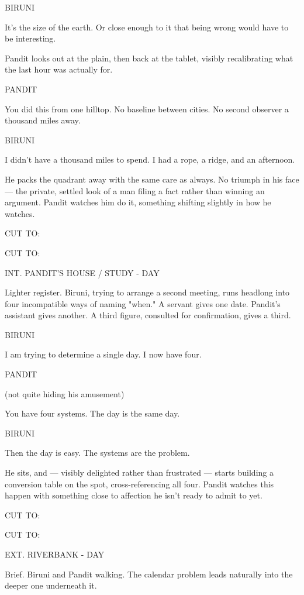 \documentclass[12pt]{article}
\newcommand{\sceneheading}[1]{%
  \needspace{4\baselineskip}%
  \par\vspace{1\baselineskip}\noindent #1\par\vspace{0.6\baselineskip}%
}
\newcommand{\action}[1]{%
  \par\noindent #1\par\vspace{0.6\baselineskip}%
}
\newcommand{\transition}[1]{%
  \par\vspace{0.3\baselineskip}%
  \ifthenelse{\equal{#1}{FADE IN:}}%
    {\noindent #1\par}%
    {\noindent\hfill #1\par}%
  \vspace{0.6\baselineskip}%
}
\newcommand{\charcue}[1]{%
  \needspace{3\baselineskip}%
  \par\vspace{0.3\baselineskip}\noindent\hspace*{2.2in}#1\par%
}
\newenvironment{dialogue}{%
  \begin{list}{}{%
    \setlength{\leftmargin}{1.1in}%
    \setlength{\rightmargin}{1.6in}%
    \setlength{\listparindent}{0pt}%
    \setlength{\itemindent}{0pt}%
    \setlength{\parsep}{0pt}%
    \setlength{\itemsep}{0pt}%
    \setlength{\topsep}{0pt}%
  }\item[]%
}{%
  \end{list}\vspace{0.4\baselineskip}%
}
\newcommand{\parenthetical}[1]{%
  \hspace*{-0.4in}\hspace*{1.1in}(#1)\par%
}
\begin{document}
\charcue{BIRUNI}
\begin{dialogue}
It's the size of the earth. Or close enough to it that being wrong would have to be interesting.\\
\end{dialogue}
\action{Pandit looks out at the plain, then back at the tablet, visibly recalibrating what the last hour was actually for.}
\charcue{PANDIT}
\begin{dialogue}
You did this from one hilltop. No baseline between cities. No second observer a thousand miles away.\\
\end{dialogue}
\charcue{BIRUNI}
\begin{dialogue}
I didn't have a thousand miles to spend. I had a rope, a ridge, and an afternoon.\\
\end{dialogue}
\action{He packs the quadrant away with the same care as always. No triumph in his face --- the private, settled look of a man filing a fact rather than winning an argument. Pandit watches him do it, something shifting slightly in how he watches.}
\transition{CUT TO:}
\sceneheading{INT. PANDIT'S HOUSE / STUDY - DAY}
\action{Lighter register. Biruni, trying to arrange a second meeting, runs headlong into four incompatible ways of naming "when." A servant gives one date. Pandit's assistant gives another. A third figure, consulted for confirmation, gives a third.}
\charcue{BIRUNI}
\begin{dialogue}
I am trying to determine a single day. I now have four.\\
\end{dialogue}
\charcue{PANDIT}
\begin{dialogue}
\parenthetical{not quite hiding his amusement}
You have four systems. The day is the same day.\\
\end{dialogue}
\charcue{BIRUNI}
\begin{dialogue}
Then the day is easy. The systems are the problem.\\
\end{dialogue}
\action{He sits, and --- visibly delighted rather than frustrated --- starts building a conversion table on the spot, cross-referencing all four. Pandit watches this happen with something close to affection he isn't ready to admit to yet.}
\transition{CUT TO:}
\sceneheading{EXT. RIVERBANK - DAY}
\action{Brief. Biruni and Pandit walking. The calendar problem leads naturally into the deeper one underneath it.}
\end{document}
